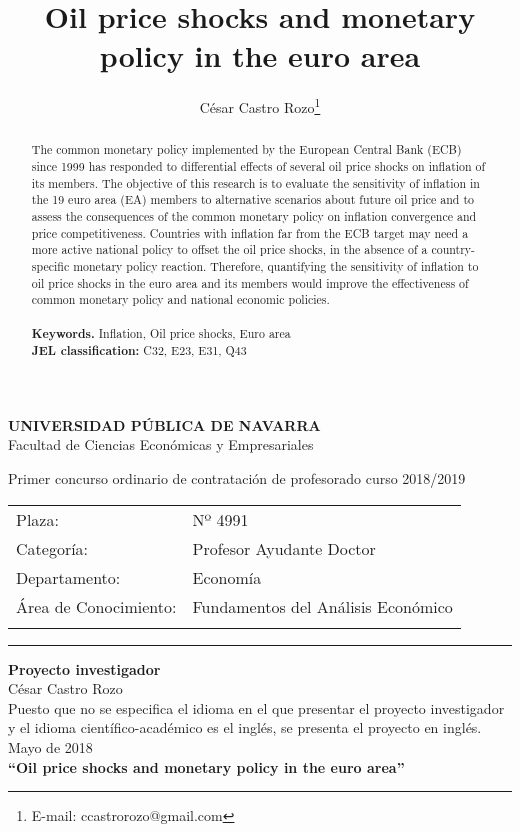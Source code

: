 \documentclass{article}\usepackage[]{graphicx}\usepackage[]{color}
\begin{document}
\begin{center}
\textbf{UNIVERSIDAD PÚBLICA DE NAVARRA}\\
Facultad de Ciencias Económicas y Empresariales
\vspace{10pt}

Primer concurso ordinario de contratación de profesorado curso 2018/2019\\
\begin{tabular}{l l}
Plaza:  & Nº 4991\\
Categoría: & Profesor Ayudante Doctor\\
Departamento: & Economía\\
Área de Conocimiento: & Fundamentos del Análisis Económico\\
\vspace{10pt}
\end{tabular}

\textcolor[RGB]{85,87,89}{\rule{\linewidth}{0.4pt}}

\textbf{Proyecto investigador}\\
César Castro Rozo\\
Puesto que no se especifica el idioma en el que presentar el proyecto investigador y el idioma científico-académico es el inglés, se presenta el proyecto en inglés.\\
Mayo de 2018\\
\vspace{5pt}
\textbf{``Oil price shocks and monetary policy in the euro area''}\\
\end{center}

\title{Oil price shocks and monetary policy in the euro area}
\author{César Castro Rozo\thanks{E-mail: ccastrorozo@gmail.com}}

\maketitle

\begin{abstract}
The common monetary policy implemented by the European Central Bank (ECB) since 1999 has responded to differential effects of several oil price shocks on inflation of its members. The objective of this research is to evaluate the sensitivity of inflation in the 19 euro area (EA) members to alternative scenarios about future oil price and to assess the consequences of the common monetary policy on inflation convergence and price competitiveness. Countries with inflation far from the ECB target may need a more active national policy to offset the oil price shocks, in the absence of a country-specific monetary policy reaction. Therefore, quantifying the sensitivity of inflation to oil price shocks in the euro area and its members would improve the effectiveness of common monetary policy and national economic policies.\\
\\
  \textbf{Keywords.} Inflation, Oil price shocks, Euro area\\
  \textbf{JEL classification:} C32, E23, E31, Q43
\end{abstract}
\end{document}
